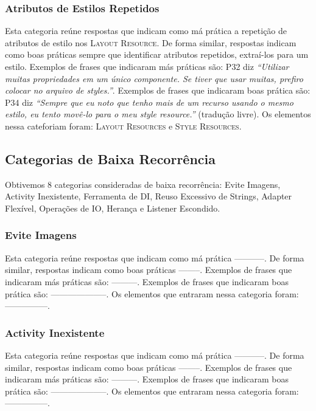 \subsubsection{Atributos de Estilos Repetidos}
Esta categoria re\'une respostas que indicam como m\'a pr\'atica a repetição de atributos de estilo nos \textsc{Layout Resource}. De forma similar, respostas indicam como boas pr\'aticas sempre que identificar atributos repetidos, extraí-los para um estilo. Exemplos de frases que indicaram m\'as pr\'aticas s\~ao: P32 diz \textit{``Utilizar muitas propriedades em um \'unico componente. Se tiver que usar muitas, prefiro colocar no arquivo de styles.''}. Exemplos de frases que indicaram boas pr\'atica s\~ao: P34 diz \textit{``Sempre que eu noto que tenho mais de um recurso usando o mesmo estilo, eu tento mov\^e-lo para o meu \textit{style resource}.''} (tradu\c{c}\~ao livre). Os elementos nessa cateforiam foram: \textsc{Layout Resources} e \textsc{Style Resources}.


\subsection{Categorias de Baixa Recorr\^encia}
Obtivemos 8 categorias consideradas de baixa recorr\^encia: Evite Imagens, Activity Inexistente, Ferramenta de DI, Reuso Excessivo de Strings, Adapter Flex\'ivel, Opera\c{c}\~oes de IO, Heran\c{c}a e Listener Escondido.

\subsubsection{Evite Imagens}
Esta categoria re\'une respostas que indicam como m\'a pr\'atica -----------. De forma similar, respostas indicam como boas pr\'aticas --------. Exemplos de frases que indicaram m\'as pr\'aticas s\~ao: ---------. Exemplos de frases que indicaram boas pr\'atica s\~ao: --------------------. Os elementos que entraram nessa categoria foram: ---------------. 


\subsubsection{Activity Inexistente}
Esta categoria re\'une respostas que indicam como m\'a pr\'atica -----------. De forma similar, respostas indicam como boas pr\'aticas --------. Exemplos de frases que indicaram m\'as pr\'aticas s\~ao: ---------. Exemplos de frases que indicaram boas pr\'atica s\~ao: --------------------. Os elementos que entraram nessa categoria foram: ---------------. 


